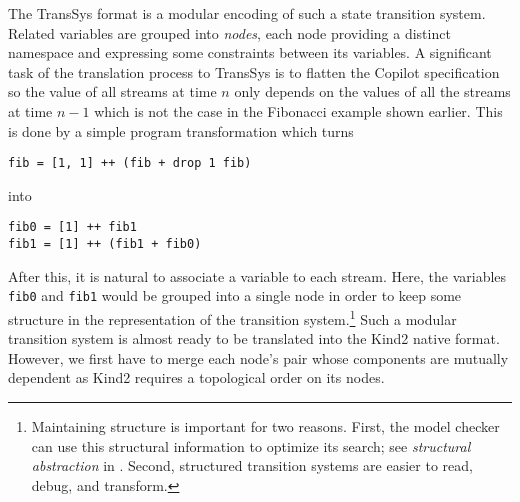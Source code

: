 The {TransSys} format is a modular encoding of such a state transition system. Related variables are grouped into \textit{nodes}, each node providing a distinct namespace and expressing some constraints between its variables. A significant task of the translation process to TransSys is to flatten the Copilot specification so the value of all streams at time $n$ only depends on the values of all the streams at time $n - 1$ which is not the case in the Fibonacci example shown earlier. This is done by a simple program transformation which turns
\begin{lstlisting}
fib = [1, 1] ++ (fib + drop 1 fib)
\end{lstlisting}
into
\begin{lstlisting}
fib0 = [1] ++ fib1
fib1 = [1] ++ (fib1 + fib0)
\end{lstlisting}

After this, it is natural to associate a variable to each stream. Here, the
variables \texttt{fib0} and \texttt{fib1} would be grouped into a single node in
order to keep some structure in the representation of the transition
system.\footnote{Maintaining structure is important for two reasons. First, the
  model checker can use this structural information to optimize its search; see \emph{structural abstraction} in \cite{HagenPhD}. Second, structured transition systems are easier to read, debug, and transform.} Such a modular transition system is almost ready to be translated into the Kind2 native format. However, we first have to merge each node's pair whose components are mutually dependent as Kind2 requires a topological order on its nodes.





